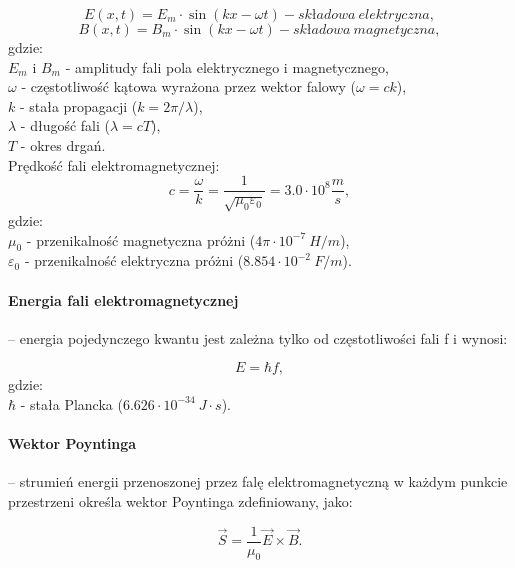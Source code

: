 \documentclass[a4paper,twoside]{report}
\begin{document}
\begin{equation}
E(x,t) = E_m \cdot \sin (kx - \omega t) - składowa~elektryczna,
\end{equation}
\begin{equation}
B(x,t) = B_m \cdot \sin (kx - \omega t) - składowa~magnetyczna,
\end{equation}
gdzie:\\
$E_m$ i $B_m$ - amplitudy fali pola elektrycznego i magnetycznego,\\
$\omega$ - częstotliwość kątowa wyrażona przez wektor falowy ($\omega = ck$),\\
$k$ - stała propagacji ($k = 2\pi /\lambda$),\\
$\lambda$ - długość fali ($\lambda=cT$),\\
$T$ - okres drgań.\\

Prędkość fali elektromagnetycznej:
\begin{equation}
c=\dfrac{\omega}{k} = \dfrac{1}{\sqrt{\mu _0 \varepsilon _0}} = 3.0 \cdot 10^8 \dfrac{m}{s},
\end{equation}
gdzie:\\
$\mu _0$ - przenikalność magnetyczna próżni ($4\pi \cdot 10^{-7}~H/m$),\\
$\varepsilon _0$ - przenikalność elektryczna próżni ($8.854 \cdot 10^{-2}~F/m$).\\

\paragraph{Energia fali elektromagnetycznej} – energia pojedynczego kwantu jest zależna tylko od częstotliwości fali f i wynosi:

\begin{equation}
E = \hbar f,
\end{equation}
gdzie:\\
$\hbar$ - stała Plancka ($6.626 \cdot 10^{-34}~J \cdot s$). 

\paragraph{Wektor Poyntinga} – strumień energii przenoszonej przez falę elektromagnetyczną w każdym punkcie przestrzeni określa wektor Poyntinga zdefiniowany, jako:

\begin{equation}
\overrightarrow{S} = \dfrac{1}{\mu _0} \overrightarrow{E} \times \overrightarrow{B}.
\end{equation}
\end{document}
